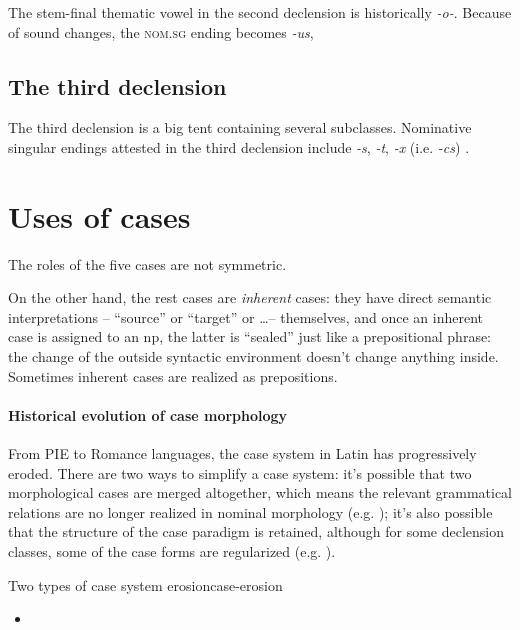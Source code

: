 \documentclass[a4paper, oneside, 12pt]{report}
\newcommand*{\citesec}[1]{\S~{#1}}
\newcommand{\form}[1]{\emph{#1}}
\newcommand*{\category}[1]{\textsc{#1}}
\begin{document}
The stem-final thematic vowel in the second declension is historically \form{-o-}.
Because of sound changes, the \category{nom.sg} ending becomes \form{-us},

\subsection{The third declension}\label{sec:np.inflection.3}

The third declension is a big tent containing several subclasses.
Nominative singular endings attested in the third declension
include \form{-s}, \form{-t}, \form{-x} (i.e. \form{-cs}) \citep[\citesec{53}]{allen1903allen}.

\section{Uses of cases}\label{sec:np.case-distribution}

The roles of the five cases are not symmetric.


On the other hand, the rest cases are \emph{inherent} cases:
they have direct semantic interpretations
-- ``source'' or ``target'' or \dots -- themselves,
and once an inherent case is assigned to an \acs{np},
the latter is ``sealed'' just like a prepositional phrase:
the change of the outside syntactic environment 
doesn't change anything inside.
Sometimes inherent cases are realized as prepositions.

\paragraph*{Historical evolution of case morphology}
From PIE to Romance languages, the case system in Latin has progressively eroded.
There are two ways to simplify a case system:
it's possible that two morphological cases are merged altogether,
which means the relevant grammatical relations are no longer realized in nominal morphology
(e.g. );
it's also possible that the structure of the case paradigm is retained,
although for some declension classes,
some of the case forms are regularized
(e.g. ).

\begin{todobox}{Two types of case system erosion}{case-erosion}
    \begin{itemize}
        \item 
    \end{itemize}
\end{todobox}
\end{document}
